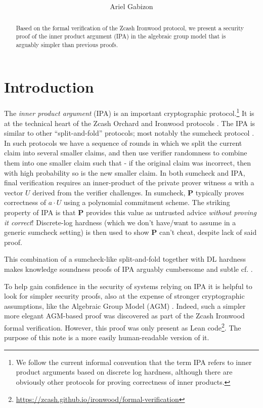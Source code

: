 \documentclass[11pt]{article} %
\title{ \bf \papertitle \\[0.72cm]}
\author{ Ariel Gabizon}
\newcommand{\prv}{\ensuremath{\mathsf{\mathbf{P}}}\xspace}
\begin{document}
    \maketitle

\begin{abstract}
Based on the formal verification of the Zcash Ironwood protocol, we present a security proof of the inner product argument (IPA) in the algebraic group model that is arguably simpler than previous proofs.

\end{abstract}

\section{Introduction}
The  \emph{inner product argument} (IPA) \cite{bootle,bulletproofs} is an important cryptographic protocol.\footnote{We follow the current informal convention that the term IPA refers to inner product arguments based on discrete log hardness, although there are obviously other protocols for proving correctness of inner products.}
It is at the technical heart of the  Zcash Orchard and Ironwood protocols \cite{zcashspec}.
The IPA is similar to other ``split-and-fold'' protocols; most notably the sumcheck protocol \cite{lfkn}.
In such protocols we have a sequence of rounds in which we split the current claim into several smaller claims, and then use verifier randomness to combine them into one smaller claim such that - if the original claim was incorrect, then with high probability so is the new smaller claim.
In both sumcheck and IPA, final verification requires an inner-product of the private prover witness $a$ with a vector $U$ derived from the verifier challenges. In sumcheck, \prv typically proves correctness of $a\cdot U$  using a polynomial commitment scheme.
The striking property of IPA is that \prv provides this value as untrusted advice \emph{without
proving it correct}! Discrete-log hardness (which we don't have/want to assume in  a generic sumcheck setting) is then used to show \prv can't cheat, despite lack of said proof.

This combination of a sumcheck-like split-and-fold together with DL hardness makes knowledge soundness proofs of IPA arguably cumbersome 
and subtle cf. \cite{bootle,bulletproofs,sumcheckipa,revisit}.

To help gain confidence in the security of systems relying on IPA it is helpful to look for simpler security proofs, also at the expense of stronger cryptographic assumptions, like the Algebraic Group Model (AGM) \cite{agm}.
Indeed, such a simpler more elegant AGM-based proof was discovered as part of the Zcash Ironwood formal verification.
However, this proof was only present as Lean code\footnote{\url{https://zcash.github.io/ironwood/formal-verification}}. The purpose of this note is a more easily human-readable version of it.
\end{document}

